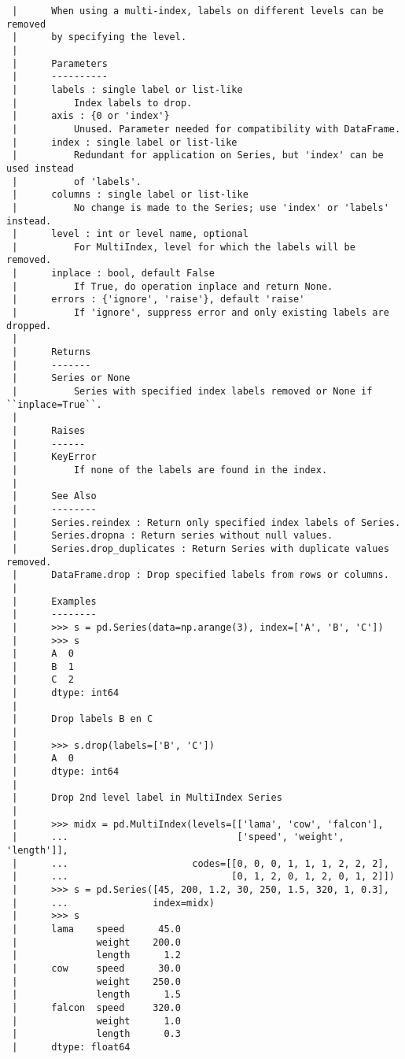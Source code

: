 \documentclass[
  letterpaper,
  DIV=11,
  numbers=noendperiod]{scrreprt}
\begin{document}
\begin{verbatim}
 |      When using a multi-index, labels on different levels can be removed
 |      by specifying the level.
 |      
 |      Parameters
 |      ----------
 |      labels : single label or list-like
 |          Index labels to drop.
 |      axis : {0 or 'index'}
 |          Unused. Parameter needed for compatibility with DataFrame.
 |      index : single label or list-like
 |          Redundant for application on Series, but 'index' can be used instead
 |          of 'labels'.
 |      columns : single label or list-like
 |          No change is made to the Series; use 'index' or 'labels' instead.
 |      level : int or level name, optional
 |          For MultiIndex, level for which the labels will be removed.
 |      inplace : bool, default False
 |          If True, do operation inplace and return None.
 |      errors : {'ignore', 'raise'}, default 'raise'
 |          If 'ignore', suppress error and only existing labels are dropped.
 |      
 |      Returns
 |      -------
 |      Series or None
 |          Series with specified index labels removed or None if ``inplace=True``.
 |      
 |      Raises
 |      ------
 |      KeyError
 |          If none of the labels are found in the index.
 |      
 |      See Also
 |      --------
 |      Series.reindex : Return only specified index labels of Series.
 |      Series.dropna : Return series without null values.
 |      Series.drop_duplicates : Return Series with duplicate values removed.
 |      DataFrame.drop : Drop specified labels from rows or columns.
 |      
 |      Examples
 |      --------
 |      >>> s = pd.Series(data=np.arange(3), index=['A', 'B', 'C'])
 |      >>> s
 |      A  0
 |      B  1
 |      C  2
 |      dtype: int64
 |      
 |      Drop labels B en C
 |      
 |      >>> s.drop(labels=['B', 'C'])
 |      A  0
 |      dtype: int64
 |      
 |      Drop 2nd level label in MultiIndex Series
 |      
 |      >>> midx = pd.MultiIndex(levels=[['lama', 'cow', 'falcon'],
 |      ...                              ['speed', 'weight', 'length']],
 |      ...                      codes=[[0, 0, 0, 1, 1, 1, 2, 2, 2],
 |      ...                             [0, 1, 2, 0, 1, 2, 0, 1, 2]])
 |      >>> s = pd.Series([45, 200, 1.2, 30, 250, 1.5, 320, 1, 0.3],
 |      ...               index=midx)
 |      >>> s
 |      lama    speed      45.0
 |              weight    200.0
 |              length      1.2
 |      cow     speed      30.0
 |              weight    250.0
 |              length      1.5
 |      falcon  speed     320.0
 |              weight      1.0
 |              length      0.3
 |      dtype: float64

\end{verbatim}
\end{document}
